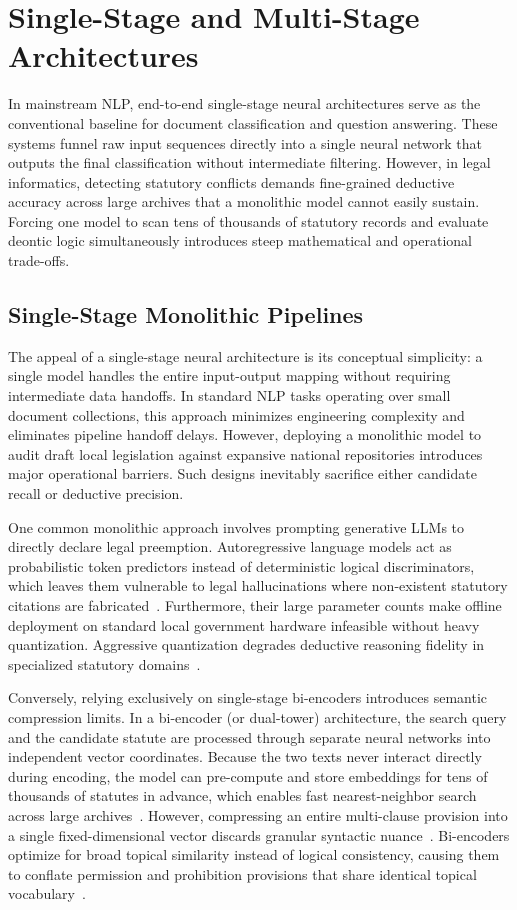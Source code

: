     

\section{Single-Stage and Multi-Stage Architectures}
In mainstream NLP, end-to-end single-stage neural architectures serve as the conventional baseline for document classification and question answering. These systems funnel raw input sequences directly into a single neural network that outputs the final classification without intermediate filtering. However, in legal informatics, detecting statutory conflicts demands fine-grained deductive accuracy across large archives that a monolithic model cannot easily sustain. Forcing one model to scan tens of thousands of statutory records and evaluate deontic logic simultaneously introduces steep mathematical and operational trade-offs.

    \subsection{Single-Stage Monolithic Pipelines}
    The appeal of a single-stage neural architecture is its conceptual simplicity: a single model handles the entire input-output mapping without requiring intermediate data handoffs. In standard NLP tasks operating over small document collections, this approach minimizes engineering complexity and eliminates pipeline handoff delays. However, deploying a monolithic model to audit draft local legislation against expansive national repositories introduces major operational barriers. Such designs inevitably sacrifice either candidate recall or deductive precision.

    One common monolithic approach involves prompting generative LLMs to directly declare legal preemption. Autoregressive language models act as probabilistic token predictors instead of deterministic logical discriminators, which leaves them vulnerable to legal hallucinations where non-existent statutory citations are fabricated~\cite{linna2026challenges}. Furthermore, their large parameter counts make offline deployment on standard local government hardware infeasible without heavy quantization. Aggressive quantization degrades deductive reasoning fidelity in specialized statutory domains~\cite{dettmers2022llmint8}. 
    
    Conversely, relying exclusively on single-stage bi-encoders introduces semantic compression limits. In a bi-encoder (or dual-tower) architecture, the search query and the candidate statute are processed through separate neural networks into independent vector coordinates. Because the two texts never interact directly during encoding, the model can pre-compute and store embeddings for tens of thousands of statutes in advance, which enables fast nearest-neighbor search across large archives~\cite{reimers2019sentencebert, chen2024bgem3}. However, compressing an entire multi-clause provision into a single fixed-dimensional vector discards granular syntactic nuance~\cite{karpukhin2020dense, thakur2021beir}. Bi-encoders optimize for broad topical similarity instead of logical consistency, causing them to conflate permission and prohibition provisions that share identical topical vocabulary~\cite{kim2024legal}.


